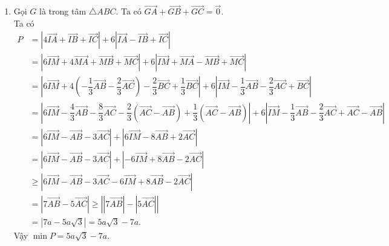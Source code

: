 \begin{bt}
{\begin{enumerate}
\begin{align*}
				\\
				\Leftrightarrow\,\,&\overrightarrow{BA}+\overrightarrow{AM}=2\left( \overrightarrow{MA}+\overrightarrow{AC}\right)
				\\
				\Leftrightarrow\,\,&-\overrightarrow{AB}+\overrightarrow{AM}=2\left(- \overrightarrow{AM}+\overrightarrow{AC}\right)
				\\
				\Leftrightarrow\,\,&3\overrightarrow{AM}= \overrightarrow{AB}+2\overrightarrow{AC}
				\\
				\Leftrightarrow\,\,&\overrightarrow{AM}=\dfrac{1}{3} \overrightarrow{AB}+\dfrac{2}{3} \overrightarrow{AC}.
			\end{align*}
			\item Gọi $G$ là trong tâm $\triangle ABC$. Ta có $\overrightarrow{GA}+\overrightarrow{GB}+\overrightarrow{GC}=\overrightarrow{0}$.
			\\
			Ta có 
			\allowdisplaybreaks
			\begin{align*}
				P&=\left| 4\overrightarrow{IA}+\overrightarrow{IB}+\overrightarrow{IC}\right|+6\left|\overrightarrow{IA}-\overrightarrow{IB}+\overrightarrow{IC}\right|
				\\
				&=\left| 6\overrightarrow{IM}+4\overrightarrow{MA}+\overrightarrow{MB}+\overrightarrow{MC}\right|+6\left|\overrightarrow{IM}+\overrightarrow{MA}-\overrightarrow{MB}+\overrightarrow{MC}\right|
				\\
				&=\left| 6\overrightarrow{IM}+4\left(-\dfrac{1}{3} \overrightarrow{AB}-\dfrac{2}{3} \overrightarrow{AC}\right)-\dfrac{2}{3}\overrightarrow{BC}+\dfrac{1}{3}\overrightarrow{BC}\right|+6\left|\overrightarrow{IM}-\dfrac{1}{3} \overrightarrow{AB}-\dfrac{2}{3} \overrightarrow{AC}+\overrightarrow{BC}\right|
				\\
				&=\left| 6\overrightarrow{IM}-\dfrac{4}{3} \overrightarrow{AB}-\dfrac{8}{3} \overrightarrow{AC}-\dfrac{2}{3}\left(\overrightarrow{AC}-\overrightarrow{AB}\right)+\dfrac{1}{3}\left(\overrightarrow{AC}-\overrightarrow{AB}\right)\right|+6\left|\overrightarrow{IM}-\dfrac{1}{3} \overrightarrow{AB}-\dfrac{2}{3} \overrightarrow{AC}+\overrightarrow{AC}-\overrightarrow{AB}\right|
				\\
				&=\left| 6\overrightarrow{IM}-\overrightarrow{AB}-3\overrightarrow{AC}\right|+\left|6\overrightarrow{IM}-8\overrightarrow{AB}+2\overrightarrow{AC}\right|
				\\
				&=\left| 6\overrightarrow{IM}-\overrightarrow{AB}-3\overrightarrow{AC}\right|+\left|-6\overrightarrow{IM}+8\overrightarrow{AB}-2\overrightarrow{AC}\right|
				\\
				&\geq \left| 6\overrightarrow{IM}-\overrightarrow{AB}-3\overrightarrow{AC}-6\overrightarrow{IM}+8\overrightarrow{AB}-2\overrightarrow{AC}\right|
				\\
				&=\left| 7\overrightarrow{AB}-5\overrightarrow{AC}\right|\geq \left| \left|7\overrightarrow{AB}\right|-\left|5\overrightarrow{AC}\right|\right|
				\\
				&=\left|7a-5a\sqrt{3}\right|=5a\sqrt{3}-7a.
			\end{align*}
		Vậy $\min P=5a\sqrt{3}-7a$.
		\end{enumerate}
	}
\end{bt}
